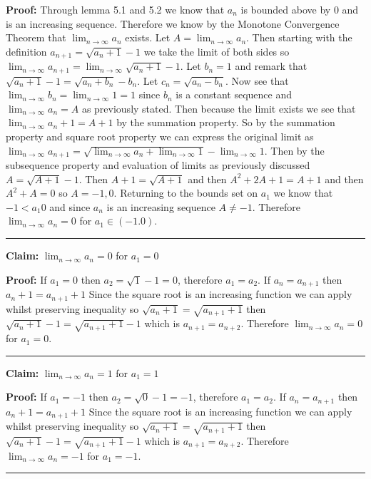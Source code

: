\documentclass[10pt,letterpaper]{article}
\newcommand\ds{\displaystyle}
\newcommand\qedsym{\hfill \rule{2mm}{2mm}}
\begin{document}
{\textbf{Proof:} Through lemma 5.1 and 5.2 we know that $a_n$ is bounded above by $0$ and is an increasing sequence. Therefore we know by the Monotone Convergence Theorem that $\ds\lim_{n\to\infty} a_n$ exists. Let $A = \ds\lim_{n\to\infty}a_n$. Then starting with the definition $a_{n+1} = \sqrt{a_{n} +1} - 1$ we take the limit of both sides so $\ds\lim_{n\to\infty}a_{n+1} = \ds\lim_{n\to\infty}\sqrt{a_{n} +1} - 1$. Let $b_n = 1$ and remark that $\sqrt{a_n + 1} -1 = \sqrt{a_n + b_n} - b_n$. Let $c_n = \sqrt{a_n - b_n}$. Now see that $\ds\lim_{n\to\infty} b_n = \ds\lim_{n\to\infty} 1 = 1$ since $b_n$ is a constant sequence and $\ds\lim_{n\to\infty} a_n = A$ as previously stated. Then because the limit exists we see that $\ds\lim_{n\to\infty} a_n + 1 = A + 1$ by the summation property. So by the summation property and square root property we can express the original limit as $\ds\lim_{n\to\infty}a_{n+1} = \sqrt{\ds\lim_{n\to\infty}a_{n} +\ds\lim_{n\to\infty}1} - \ds\lim_{n\to\infty}1$. Then by the subsequence property and evaluation of limits as previously discussed $A = \sqrt{A+1}-1$. Then $A+1 = \sqrt{A+1}$ and then $A^2 + 2A + 1 = A + 1$ and then $A^2 + A = 0$ so $A = -1, 0$. Returning to the bounds set on $a_1$ we know that $-1 < a_1 0$ and since $a_n$ is an increasing sequence $A \neq -1$. Therefore $\ds\lim_{n\to\infty} a_{n} = 0$ for $a_1 \in (-1. 0)$. \qedsym{}

\medskip

\textbf{Claim:} $\ds\lim_{n\to\infty} a_{n} = 0$ for $a_1 = 0$

\medskip

\textbf{Proof:} If $a_1 = 0$ then $a_2 = \sqrt{1} - 1 = 0$, therefore $a_1 = a_2$. If $a_n = a_{n+1}$ then $a_n + 1= a_{n+1} +1$ Since the square root is an increasing function we can apply whilst preserving inequality so $\sqrt{a_n + 1} = \sqrt{a_{n+1} +1}$ then $\sqrt{a_n + 1} - 1 = \sqrt{a_{n+1} +1} - 1$ which is $a_{n+1} = a_{n+2}$. Therefore $\ds\lim_{n\to\infty} a_{n} = 0$ for $a_1 = 0$. \qedsym{}

\medskip

\textbf{Claim:} $\ds\lim_{n\to\infty} a_{n} = 1$ for $a_1 = 1$

\medskip

\textbf{Proof:} If $a_1 = -1$ then $a_2 = \sqrt{0} - 1 = -1$, therefore $a_1 = a_2$. If $a_n = a_{n+1}$ then $a_n + 1= a_{n+1} +1$ Since the square root is an increasing function we can apply whilst preserving inequality so $\sqrt{a_n + 1} = \sqrt{a_{n+1} +1}$ then $\sqrt{a_n + 1} - 1 = \sqrt{a_{n+1} +1} - 1$ which is $a_{n+1} = a_{n+2}$. Therefore $\ds\lim_{n\to\infty} a_{n} = -1$ for $a_1 = -1$. \qedsym{}

}
\end{document}
